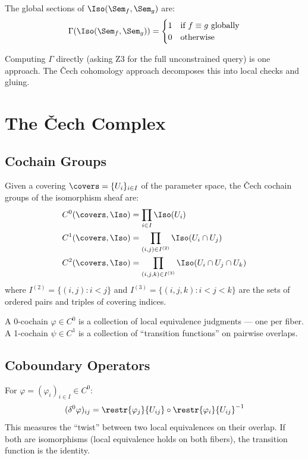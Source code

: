 The global sections of $\Iso(\Sem_f, \Sem_g)$ are:
\[
  \Gamma(\Iso(\Sem_f, \Sem_g)) = \begin{cases}
    1 & \text{if $f \equiv g$ globally} \\
    0 & \text{otherwise}
  \end{cases}
\]

Computing $\Gamma$ directly (asking Z3 for the full unconstrained
query) is one approach.  The \v{C}ech cohomology approach decomposes
this into local checks and gluing.


\chapter{The \v{C}ech Complex}
\label{ch:cech}

\section{Cochain Groups}

\begin{definition}
Given a covering $\covers = \{U_i\}_{i \in I}$ of the parameter space,
the \v{C}ech cochain groups of the isomorphism sheaf are:
\begin{align}
  C^0(\covers, \Iso) &= \prod_{i \in I} \Iso(U_i) \\
  C^1(\covers, \Iso) &= \prod_{(i,j) \in I^{(2)}} \Iso(U_i \cap U_j) \\
  C^2(\covers, \Iso) &= \prod_{(i,j,k) \in I^{(3)}}
    \Iso(U_i \cap U_j \cap U_k)
\end{align}
where $I^{(2)} = \{(i,j) : i < j\}$ and
$I^{(3)} = \{(i,j,k) : i < j < k\}$ are the sets of ordered pairs
and triples of covering indices.
\end{definition}

A 0-cochain $\varphi \in C^0$ is a collection of local
equivalence judgments --- one per fiber.  A 1-cochain
$\psi \in C^1$ is a collection of ``transition functions'' on
pairwise overlaps.

\section{Coboundary Operators}

\begin{definition}
\label{def:delta0}
For $\varphi = (\varphi_i)_{i \in I} \in C^0$:
\[
  (\delta^0 \varphi)_{ij} = \restr{\varphi_j}{U_{ij}} \circ
    \restr{\varphi_i}{U_{ij}}^{-1}
\]
This measures the ``twist'' between two local equivalences on their
overlap.  If both are isomorphisms (local equivalence holds on both
fibers), the transition function is the identity.
\end{definition}

